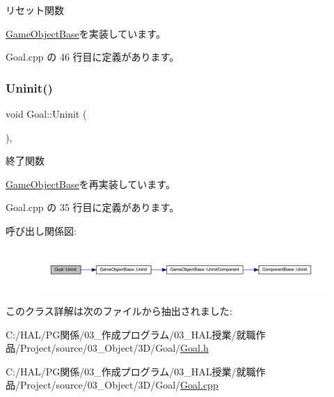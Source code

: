 リセット関数 



\mbox{\hyperlink{class_game_object_base_a85c59554f734bcb09f1a1e18d9517dce}{Game\+Object\+Base}}を実装しています。



 Goal.\+cpp の 46 行目に定義があります。

\mbox{\label{class_goal_a48126385a674bcda855e2a61561fbf9f}} 
\subsubsection{\texorpdfstring{Uninit()}{Uninit()}}
{\footnotesize\ttfamily void Goal\+::\+Uninit (\begin{DoxyParamCaption}{ }\end{DoxyParamCaption})\hspace{0.3cm}{\ttfamily [override]}, {\ttfamily [virtual]}}



終了関数 



\mbox{\hyperlink{class_game_object_base_a97e1bc277d7b1c0156d4735de29a022c}{Game\+Object\+Base}}を再実装しています。



 Goal.\+cpp の 35 行目に定義があります。

呼び出し関係図\+:\nopagebreak
\begin{figure}[H]
\begin{center}
\leavevmode
\includegraphics[width=350pt]{class_goal_a48126385a674bcda855e2a61561fbf9f_cgraph}
\end{center}
\end{figure}


このクラス詳解は次のファイルから抽出されました\+:\begin{DoxyCompactItemize}
\item 
C\+:/\+H\+A\+L/\+P\+G関係/03\+\_\+作成プログラム/03\+\_\+\+H\+A\+L授業/就職作品/\+Project/source/03\+\_\+\+Object/3\+D/\+Goal/\mbox{\hyperlink{_goal_8h}{Goal.\+h}}\item 
C\+:/\+H\+A\+L/\+P\+G関係/03\+\_\+作成プログラム/03\+\_\+\+H\+A\+L授業/就職作品/\+Project/source/03\+\_\+\+Object/3\+D/\+Goal/\mbox{\hyperlink{_goal_8cpp}{Goal.\+cpp}}\end{DoxyCompactItemize}
